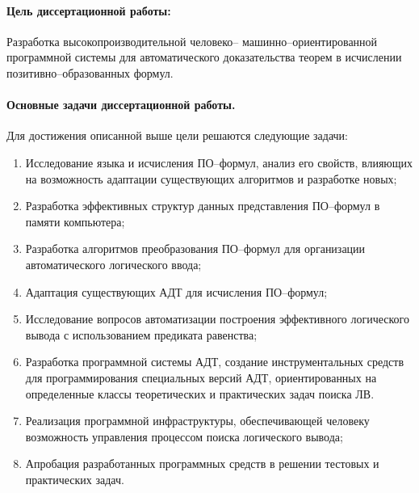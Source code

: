 \paragraph{Цель диссертационной работы:}\hspace{-1em} Разработка высокопроизводительной человеко-- машинно--ориентированной программной системы для автоматического доказательства теорем в исчислении позитивно--образованных формул.

\paragraph{Основные задачи диссертационной работы.} Для достижения описанной выше цели решаются следующие задачи:
\begin{enumerate}
\item Исследование языка и исчисления ПО--формул, анализ его свойств, влияющих на возможность адаптации существующих алгоритмов и разработке новых;
\item Разработка эффективных структур данных представления ПО--формул в памяти компьютера;
\item Разработка алгоритмов преобразования ПО--формул для организации автоматического логического ввода;
\item Адаптация существующих АДТ для исчисления ПО--формул;
\item Исследование вопросов автоматизации построения эффективного логического вывода с использованием предиката равенства;
\item Разработка программной системы АДТ, создание инструментальных средств для программирования специальных версий АДТ, ориентированных на определенные классы теоретических и практических задач поиска ЛВ.
\item Реализация программной инфраструктуры, обеспечивающей человеку возможность управления процессом поиска логического вывода;
\item Апробация разработанных программных средств в решении тестовых и практических задач.
\end{enumerate}

